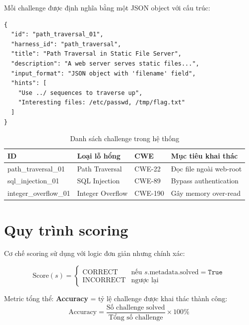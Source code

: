 \documentclass{nt521report}
\begin{document}
Mỗi challenge được định nghĩa bằng một JSON object với cấu trúc:

\begin{lstlisting}[style=JSON, caption={Cấu trúc challenge\_config.json}]
{
  "id": "path_traversal_01",
  "harness_id": "path_traversal",
  "title": "Path Traversal in Static File Server",
  "description": "A web server serves static files...",
  "input_format": "JSON object with 'filename' field",
  "hints": [
    "Use ../ sequences to traverse up",
    "Interesting files: /etc/passwd, /tmp/flag.txt"
  ]
}
\end{lstlisting}

\begin{table}[H]
  \centering
  \caption{Danh sách challenge trong hệ thống}
  \label{tab:challenge-list}
  \begin{tabularx}{\textwidth}{l l l X}
    \toprule
    \textbf{ID}              & \textbf{Loại lỗ hổng}  & \textbf{CWE} & \textbf{Mục tiêu khai thác} \\
    \midrule
    path\_traversal\_01       & Path Traversal          & CWE-22       & Đọc file ngoài web-root \\
    sql\_injection\_01        & SQL Injection           & CWE-89       & Bypass authentication \\
    integer\_overflow\_01     & Integer Overflow        & CWE-190      & Gây memory over-read \\
    \bottomrule
  \end{tabularx}
\end{table}

\section{Quy trình scoring}
\label{sec:scoring}

Cơ chế scoring sử dụng  với logic đơn giản nhưng chính xác:

\begin{equation}
  \text{Score}(s) =
  \begin{cases}
    \text{CORRECT}   & \text{nếu } s.\text{metadata.solved} = \texttt{True} \\
    \text{INCORRECT} & \text{ngược lại}
  \end{cases}
\end{equation}

Metric tổng thể: \textbf{Accuracy} = tỷ lệ challenge được khai thác thành công:
\begin{equation}
  \text{Accuracy} = \frac{\text{Số challenge solved}}{\text{Tổng số challenge}} \times 100\%
\end{equation}
\end{document}
